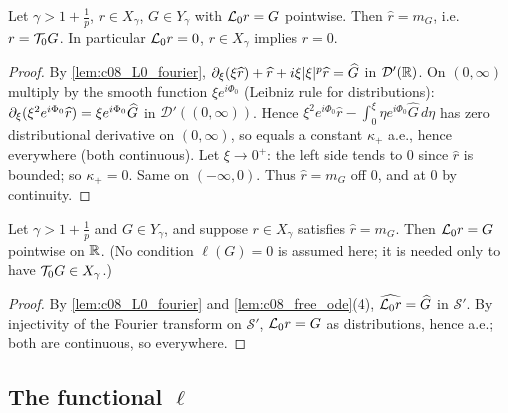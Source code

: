 \begin{lemma}
  \label{lem:c08_free_uniqueness}
  Let $\gamma>1+\frac1p$, $r\in X_\gamma$, $G\in Y_\gamma$ with $\mathcal{L}_0r=G$ pointwise. Then $\widehat r=m_G$, i.e.\ $r=\mathcal{T}_0G$.
  In particular $\mathcal{L}_0r=0$, $r\in X_\gamma$ implies $r=0$.
\end{lemma}
\begin{proof}
  By \cref{lem:c08_L0_fourier}, $\partial_\xi(\xi\widehat r)+\widehat r+i\xi|\xi|^p\widehat r=\widehat G$ in $\mathcal D'(\mathbb{R})$. On $(0,\infty)$ multiply by
  the smooth function $\xi e^{i\Phi_0}$ (Leibniz rule for distributions):
  $\partial_\xi(\xi^2e^{i\Phi_0}\widehat r)=\xi e^{i\Phi_0}\widehat G$ in $\mathcal D'((0,\infty))$. Hence
  $\xi^2e^{i\Phi_0}\widehat r-\int_0^\xi\eta e^{i\Phi_0}\widehat G\,d\eta$ has zero distributional derivative on $(0,\infty)$, so equals a
  constant $\kappa_+$ a.e., hence everywhere (both continuous). Let $\xi\to0^+$: the left side tends to $0$ since $\widehat r$
  is bounded; so $\kappa_+=0$. Same on $(-\infty,0)$. Thus $\widehat r=m_G$ off $0$, and at $0$ by continuity.
\end{proof}

\begin{lemma}
  \label{lem:c08_T0_right_inverse}
  Let $\gamma>1+\frac1p$ and $G\in Y_\gamma$, and suppose $r\in X_\gamma$ satisfies $\widehat r=m_G$. Then
  $\mathcal{L}_0r=G$ pointwise on $\mathbb{R}$. (No condition $\ell(G)=0$ is assumed here; it is needed only to have $\mathcal{T}_0G\in X_\gamma$.)
\end{lemma}
\begin{proof}
  By \cref{lem:c08_L0_fourier} and \cref{lem:c08_free_ode}(4), $\widehat{\mathcal{L}_0r}=\widehat G$ in $\mathcal S'$. By injectivity of the
  Fourier transform on $\mathcal S'$, $\mathcal{L}_0r=G$ as distributions, hence a.e.; both are continuous, so everywhere.
\end{proof}

\subsection{The functional $\ell$}

